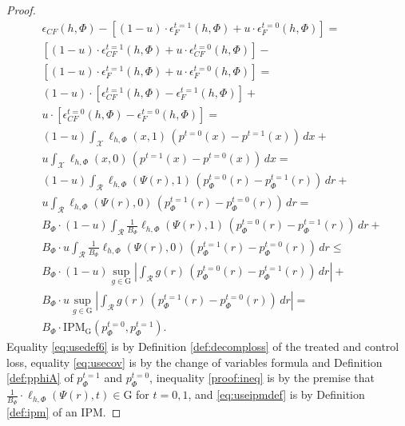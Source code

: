 \documentclass{article}
\def\cX{\mathcal X}
\def\cF{\mathrm{G}}
\def\cR{\mathcal{R}}
\newcommand{\pc}{p^{t=0}}
\newcommand{\pt}{p^{t=1}}
\newcommand{\lythr}{\ell_{h,\Phi}(\Psi(r),t)}
\newcommand{\lyxzeroh}{\ell_{h,\Phi}(x,0)}
\newcommand{\lyxoneh}{\ell_{h,\Phi}(x,1)}
\newcommand{\lyzerohpsi}{\ell_{h,\Phi}(\Psi(r),0)}
\newcommand{\lyonehpsi}{\ell_{h,\Phi}(\Psi(r),1)}
\begin{document}
\begin{proof}
\allowdisplaybreaks
\begin{align}
&\epsilon_{CF}(h,\Phi) - \left[ (1-u)\cdot \epsilon^{t=1}_{F}(h,\Phi) + u\cdot  \epsilon^{t=0}_{F}(h,\Phi) \right]= \nonumber \\
&\left[ (1-u)\cdot \epsilon^{t=1}_{CF}(h,\Phi) + u\cdot  \epsilon^{t=0}_{CF}(h,\Phi)\right] - \nonumber \\ 
&\left[ (1-u)\cdot \epsilon^{t=1}_{F}(h,\Phi) + u\cdot  \epsilon^{t=0}_{F}(h,\Phi)\right] = \nonumber  \\
&(1-u)\cdot \left[\epsilon^{t=1}_{CF}(h,\Phi)  - \epsilon^{t=1}_{F}(h,\Phi)\right]  + \nonumber \\
&u\cdot \left[\epsilon^{t=0}_{CF}(h,\Phi)  - \epsilon^{t=0}_{F}(h,\Phi)\right]  = \label{eq:usedef6}\\
&(1-u)\int_{\cX} \!\!\! \lyxoneh\, \left(\pc(x) - \pt(x)\right) \, dx  + \nonumber \\
& u  \int_{\cX} \!\!\!  \lyxzeroh\, \left(\pt(x) - \pc(x) \right)\, dx = \label{eq:usecov} \\
&(1-u)\int_{\cR} \!\!\! \lyonehpsi\, \left(\pc_\Phi(r) - \pt_\Phi(r)\right) \, dr  + \nonumber \\
& u  \int_{\cR} \!\!\!  \lyzerohpsi\, \left(\pt_\Phi(r) - \pc_\Phi(r) \right)\, dr = \nonumber \\
&B_\Phi \cdot (1-u)\int_{\cR} \!\! \frac{1}{B_\Phi}\lyonehpsi\, \left(\pc_\Phi(r) - \pt_\Phi(r)\right) \, dr  + \nonumber \\
& B_\Phi \cdot  u  \int_{\cR} \!\! \frac{1}{B_\Phi} \lyzerohpsi\, \left(\pt_\Phi(r) - \pc_\Phi(r) \right)\, dr \leq \label{proof:ineq} \\
&B_\Phi \cdot (1-u)\sup_{g\in \cF} \left| \int_{\cR} \!\! g(r)\, \left(\pc_\Phi(r) - \pt_\Phi(r)\right) \, dr  \right| + \nonumber \\
& B_\Phi \cdot u \sup_{g\in \cF} \left| \int_{\cR} \!\! g(r)\, \left(\pt_\Phi(r) - \pc_\Phi(r) \right)\, dr \right| = \label{eq:useipmdef}\\
&B_\Phi \cdot \text{IPM}_\cF(\pc_\Phi,\pt_\Phi) .
\end{align}
Equality \eqref{eq:usedef6} is by Definition \ref{def:decomploss} of the treated and control loss, equality \eqref{eq:usecov} is by the change of variables formula and Definition \ref{def:pphiA} of $\pt_\Phi$ and $\pc_\Phi$, inequality \eqref{proof:ineq} is by the premise that $\frac{1}{B_\Phi} \cdot  \lythr \in \cF$ for $t=0,1$, and \eqref{eq:useipmdef} is by Definition \ref{def:ipm} of an IPM.
\end{proof}
\end{document}
